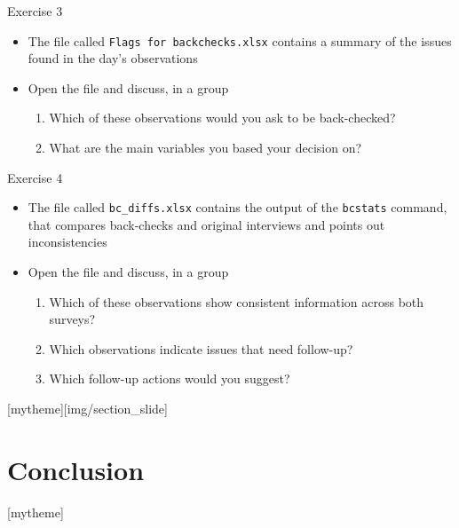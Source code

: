 \documentclass[aspectratio=169]{beamer}
\newcommand{\sectionpic}[2]{
	\setbeamertemplate{section page}[mytheme][#2]
	\section{#1}
	\setbeamertemplate{section page}[mytheme]
}
\begin{document}
\begin{frame}{Exercise 3}
    \begin{itemize}
    	\item The file called \texttt{Flags for backchecks.xlsx} contains a summary of the issues found in the day's observations
    	\item Open the file and discuss, in a group
    	\begin{enumerate}
    		\item Which of these observations would you ask to be back-checked?
    		\item What are the main variables you based your decision on?
    	\end{enumerate}
    \end{itemize}
\end{frame}

\begin{frame}{Exercise 4}
    \begin{itemize}
    	\item The file called \texttt{bc\_diffs.xlsx} contains the output of the \texttt{bcstats} command, that compares back-checks and original interviews and points out inconsistencies
    	\item Open the file and discuss, in a group
    	\begin{enumerate}
    		\item Which of these observations show consistent information across both surveys?
    		\item Which observations indicate issues that need follow-up?
    		\item Which follow-up actions would you suggest?
    	\end{enumerate}
    \end{itemize}
\end{frame}


\sectionpic{Conclusion}{img/section_slide}
\end{document}
